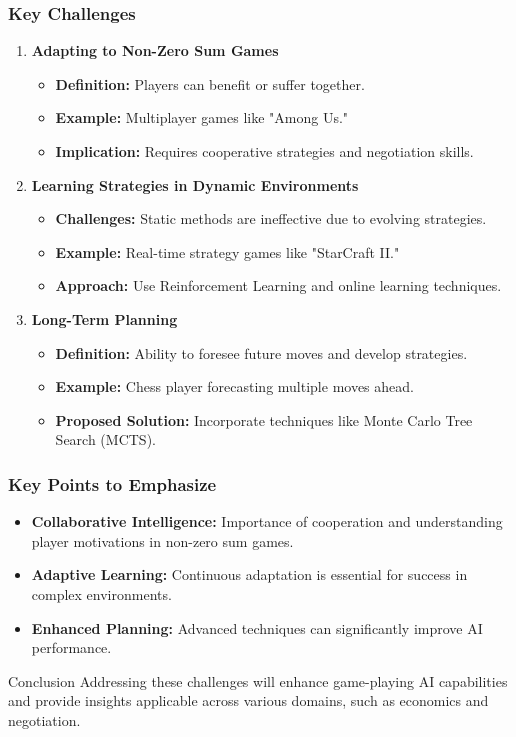 \documentclass[aspectratio=169]{beamer}
\begin{document}
\begin{frame}[fragile]
    \frametitle{Key Challenges}
    \begin{enumerate}
        \item \textbf{Adapting to Non-Zero Sum Games}
            \begin{itemize}
                \item \textbf{Definition:} Players can benefit or suffer together.
                \item \textbf{Example:} Multiplayer games like "Among Us."
                \item \textbf{Implication:} Requires cooperative strategies and negotiation skills.
            \end{itemize}
        
        \item \textbf{Learning Strategies in Dynamic Environments}
            \begin{itemize}
                \item \textbf{Challenges:} Static methods are ineffective due to evolving strategies.
                \item \textbf{Example:} Real-time strategy games like "StarCraft II."
                \item \textbf{Approach:} Use Reinforcement Learning and online learning techniques.
            \end{itemize}

        \item \textbf{Long-Term Planning}
            \begin{itemize}
                \item \textbf{Definition:} Ability to foresee future moves and develop strategies.
                \item \textbf{Example:} Chess player forecasting multiple moves ahead.
                \item \textbf{Proposed Solution:} Incorporate techniques like Monte Carlo Tree Search (MCTS).
            \end{itemize}
    \end{enumerate}
\end{frame}

\begin{frame}[fragile]
    \frametitle{Key Points to Emphasize}
    \begin{itemize}
        \item \textbf{Collaborative Intelligence:} Importance of cooperation and understanding player motivations in non-zero sum games.
        \item \textbf{Adaptive Learning:} Continuous adaptation is essential for success in complex environments.
        \item \textbf{Enhanced Planning:} Advanced techniques can significantly improve AI performance.
    \end{itemize}
    \begin{block}{Conclusion}
        Addressing these challenges will enhance game-playing AI capabilities and provide insights applicable across various domains, such as economics and negotiation.
    \end{block}
\end{frame}
\end{document}
